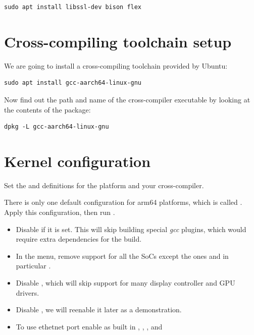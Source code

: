 \begin{verbatim}
sudo apt install libssl-dev bison flex
\end{verbatim}

\section{Cross-compiling toolchain setup}

We are going to install a cross-compiling toolchain provided by Ubuntu:

\begin{verbatim}
sudo apt install gcc-aarch64-linux-gnu
\end{verbatim}

Now find out the path and name of the cross-compiler executable by looking at the contents of the package:

\begin{verbatim}
dpkg -L gcc-aarch64-linux-gnu
\end{verbatim}

\section{Kernel configuration}

Set the  and  definitions for the 
platform and your cross-compiler.

There is only one default configuration for arm64 platforms, which is called
. Apply this configuration, then run .

\begin{itemize}
\item Disable  if it is set. This will skip
  building special {\em gcc} plugins, which would require extra dependencies
  for the build.
\item In the  menu, remove support for all the SoCs except the  ones and in particular .
\item Disable , which will skip support for many display
controller and GPU drivers.
\item Disable , we will reenable it later as a demonstration.
\item To use ethetnet port enable as built in , , , and 

\end{itemize}

